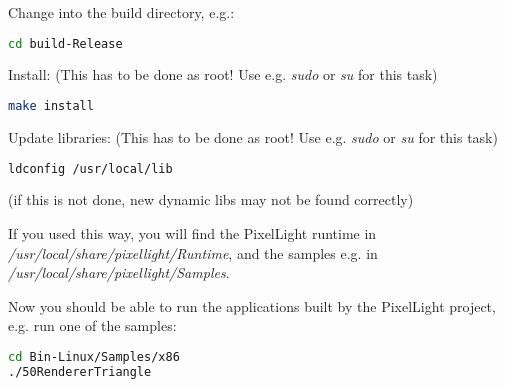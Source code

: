 Change into the build directory, e.g.:
\begin{lstlisting}[language=bash]
cd build-Release
\end{lstlisting}

Install: (This has to be done as root! Use e.g. \emph{sudo} or \emph{su} for this task)
\begin{lstlisting}[language=bash]
make install
\end{lstlisting}

Update libraries: (This has to be done as root! Use e.g. \emph{sudo} or \emph{su} for this task)
\begin{lstlisting}[language=bash]
ldconfig /usr/local/lib
\end{lstlisting}
(if this is not done, new dynamic libs may not be found correctly)

If you used this way, you will find the PixelLight runtime in \emph{/usr/local/share/pixellight/Runtime}, and the samples e.g. in \emph{/usr/local/share/pixellight/Samples}.

Now you should be able to run the applications built by the PixelLight project, e.g. run one of the samples:
\begin{lstlisting}[language=bash]
cd Bin-Linux/Samples/x86
./50RendererTriangle
\end{lstlisting}
